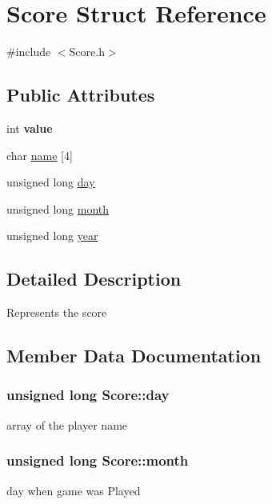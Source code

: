 \hypertarget{structScore}{}\section{Score Struct Reference}
\label{structScore}


{\ttfamily \#include $<$Score.\+h$>$}

\subsection*{Public Attributes}
\begin{DoxyCompactItemize}
\item 
int {\bfseries value}\hypertarget{structScore_a43673f1f88d6d44ae71b98116f33c9ed}{}\label{structScore_a43673f1f88d6d44ae71b98116f33c9ed}

\item 
char \hyperlink{structScore_aaedadfca0777f0b02a0693f7bc33d948}{name} \mbox{[}4\mbox{]}
\item 
unsigned long \hyperlink{structScore_a56ec2b2e99dbbb4a50fc5918f671e92c}{day}
\item 
unsigned long \hyperlink{structScore_a2e3a5ba3d59db44ce06669644f5d0021}{month}
\item 
unsigned long \hyperlink{structScore_ac8b7159609235b1cf0bbe6f82a3e0db3}{year}
\end{DoxyCompactItemize}


\subsection{Detailed Description}
Represents the score 

\subsection{Member Data Documentation}
\subsubsection[{\texorpdfstring{day}{day}}]{\setlength{\rightskip}{0pt plus 5cm}unsigned long Score\+::day}\hypertarget{structScore_a56ec2b2e99dbbb4a50fc5918f671e92c}{}\label{structScore_a56ec2b2e99dbbb4a50fc5918f671e92c}
array of the player name 
\subsubsection[{\texorpdfstring{month}{month}}]{\setlength{\rightskip}{0pt plus 5cm}unsigned long Score\+::month}\hypertarget{structScore_a2e3a5ba3d59db44ce06669644f5d0021}{}\label{structScore_a2e3a5ba3d59db44ce06669644f5d0021}
day when game was Played 
